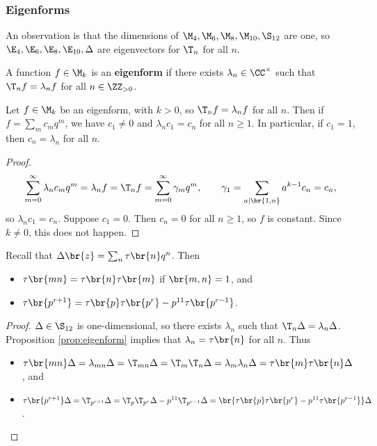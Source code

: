 \subsubsection{Eigenforms}

An observation is that the dimensions of $ \M_4, \M_6, \M_8, \M_{10}, \S_{12} $ are one, so $ \E_4, \E_6, \E_8, \E_{10}, \Delta $ are eigenvectors for $ \T_n $ for all $ n $.

\begin{definition}
A function $ f \in \M_k $ is an \textbf{eigenform} if there exists $ \lambda_n \in \CC^\times $ such that $ \T_nf = \lambda_nf $ for all $ n \in \ZZ_{> 0} $.
\end{definition}


\begin{proposition}
\label{prop:eigenform}
Let $ f \in \M_k $ be an eigenform, with $ k > 0 $, so $ \T_nf = \lambda_nf $ for all $ n $. Then if $ f = \sum_m c_mq^m $, we have $ c_1 \ne 0 $ and $ \lambda_nc_1 = c_n $ for all $ n \ge 1 $. In particular, if $ c_1 = 1 $, then $ c_n = \lambda_n $ for all $ n $.
\end{proposition}

\begin{proof}
$$ \sum_{m = 0}^\infty \lambda_nc_mq^m = \lambda_nf = \T_nf = \sum_{m = 0}^\infty \gamma_mq^m, \qquad \gamma_1 = \sum_{a \mid \br{1, n}} a^{k - 1}c_n = c_n, $$
so $ \lambda_nc_1 = c_n $. Suppose $ c_1 = 0 $. Then $ c_n = 0 $ for all $ n \ge 1 $, so $ f $ is constant. Since $ k \ne 0 $, this does not happen.
\end{proof}

\begin{corollary}
Recall that $ \Delta\br{z} = \sum_n \tau\br{n}q^n $. Then
\begin{itemize}
\item $ \tau\br{mn} = \tau\br{n}\tau\br{m} $ if $ \br{m, n} = 1 $, and
\item $ \tau\br{p^{r + 1}} = \tau\br{p}\tau\br{p^r} - p^{11}\tau\br{p^{r - 1}} $.
\end{itemize}
\end{corollary}

\begin{proof}
$ \Delta \in \S_{12} $ is one-dimensional, so there exists $ \lambda_n $ such that $ \T_n\Delta = \lambda_n\Delta $. Proposition \ref{prop:eigenform} implies that $ \lambda_n = \tau\br{n} $ for all $ n $. Thus
\begin{itemize}
\item $ \tau\br{mn}\Delta = \lambda_{mn}\Delta = \T_{mn}\Delta = \T_m\T_n\Delta = \lambda_m\lambda_n\Delta = \tau\br{m}\tau\br{n}\Delta $, and
\item $ \tau\br{p^{r + 1}}\Delta = \T_{p^{r + 1}}\Delta = \T_p\T_{p^r}\Delta - p^{11}\T_{p^{r - 1}}\Delta = \br{\tau\br{p}\tau\br{p^r} - p^{11}\tau\br{p^{r - 1}}}\Delta $.
\end{itemize}
\end{proof}

